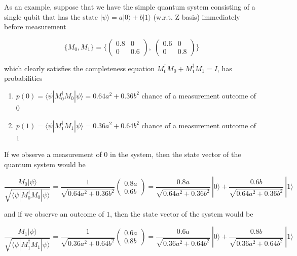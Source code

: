 \documentclass{article}
\newcounter{example}[section]
\begin{document}
      
      \begin{example}
        \label{ex:simple-example-of-general-measurement}
        As an example, suppose that we have the simple quantum system consisting of a single qubit that has the state $|\psi \rangle = a|0\rangle + b|1 \rangle$  (w.r.t. Z basis) immediately before measurement

          \begin{equation}
            \{M_0, M_1\} = \bigg\{ \begin{pmatrix} 0.8 & 0 \\  0 & 0.6 \end{pmatrix}, \; \begin{pmatrix} 0.6&0\\0&0.8 \end{pmatrix} \bigg\}
          \end{equation}

        which clearly satisfies the completeness equation $M_0^\dagger M_0 + M_1^\dagger M_1 = I$, has probabilities

        \begin{enumerate}
          \item $p(0) = \langle \psi | M_0^\dagger M_0 | \psi \rangle = 0.64 a^2 + 0.36b^2$ chance of a measurement outcome of $0$
          \item $p(1) = \langle \psi | M_1^\dagger M_1 | \psi \rangle = 0.36 a^2 + 0.64b^2$ chance of a measurement outcome of $1$
        \end{enumerate}

        If we observe a measurement of $0$ in the system, then the state vector of the quantum system would be

          \begin{equation}
            \frac{M_0 | \psi\rangle}{\sqrt{\langle \psi | M_0^\dagger M_0 | \psi\rangle}} = \frac{1}{\sqrt{0.64a^2 + 0.36b^2}} \begin{pmatrix} 0.8a \\ 0.6b \end{pmatrix} = \frac{0.8a}{\sqrt{0.64a^2 + 0.36b^2}}\, |0 \rangle + \frac{0.6 b}{\sqrt{0.64a^2 + 0.36b^2}} \, |1\rangle
          \end{equation}

        and if we observe an outcome of $1$, then the state vector of the system would be

          \begin{equation}
            \frac{M_1 | \psi\rangle}{\sqrt{\langle \psi | M_1^\dagger M_1 | \psi\rangle}} = \frac{1}{\sqrt{0.36a^2 + 0.64b^2}} \begin{pmatrix} 0.6a \\ 0.8b \end{pmatrix} = \frac{0.6a}{\sqrt{0.36a^2 + 0.64b^2}}\, |0 \rangle + \frac{0.8 b}{\sqrt{0.36a^2 + 0.64b^2}} \, |1\rangle
          \end{equation}
      \end{example}
\end{document}
